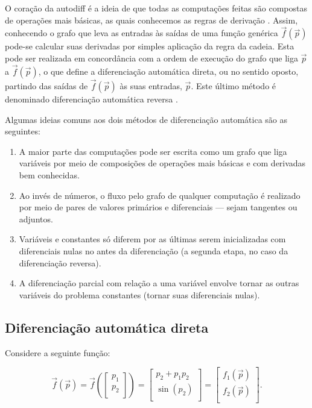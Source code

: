     O coração da autodiff é a ideia de que todas as computações feitas são compostas de operações mais básicas, as quais conhecemos as regras de derivação . Assim, conhecendo o grafo que leva as entradas às saídas de uma função genérica $\vec{f}(\vec{p})$ pode-se calcular suas derivadas por simples aplicação da regra da cadeia. Esta pode ser realizada em concordância com a ordem de execução do grafo que liga $\vec{p}$ a $\vec{f}(\vec{p})$, o que define a diferenciação automática direta, ou no sentido oposto, partindo das saídas de $\vec{f}(\vec{p})$ às suas entradas, $\vec{p}$. Este último método é denominado diferenciação automática reversa .

    Algumas ideias comuns aos dois métodos de diferenciação automática são as seguintes:
    \begin{enumerate}
      \item A maior parte das computações pode ser escrita como um grafo que liga variáveis por meio de composições de operações mais básicas e com derivadas bem conhecidas.
      \item Ao invés de números, o fluxo pelo grafo de qualquer computação é realizado por meio de pares de valores primários e diferenciais --- sejam tangentes ou adjuntos.
      \item Variáveis e constantes só diferem por as últimas serem inicializadas com diferenciais nulas no antes da diferenciação (a segunda etapa, no caso da diferenciação reversa).
      \item A diferenciação parcial com relação a uma variável envolve tornar as outras variáveis do problema constantes (tornar suas diferenciais nulas).
    \end{enumerate}

    \subsection{Diferenciação automática direta}

      Considere a seguinte função:

      \begin{equation} \label{e:autodiff_direta_exemplo}
        \vec{f}(\vec{p}) = \vec{f}\left(
        \begin{bmatrix}
          p_1 \\
          p_2 \\
        \end{bmatrix}
        \right) =
        \begin{bmatrix}
          p_2 + p_1 p_2 \\
          \sin(p_2) \\
        \end{bmatrix} =
        \begin{bmatrix}
          f_1(\vec{p}) \\
          f_2(\vec{p}) \\
        \end{bmatrix}
        .
      \end{equation}

